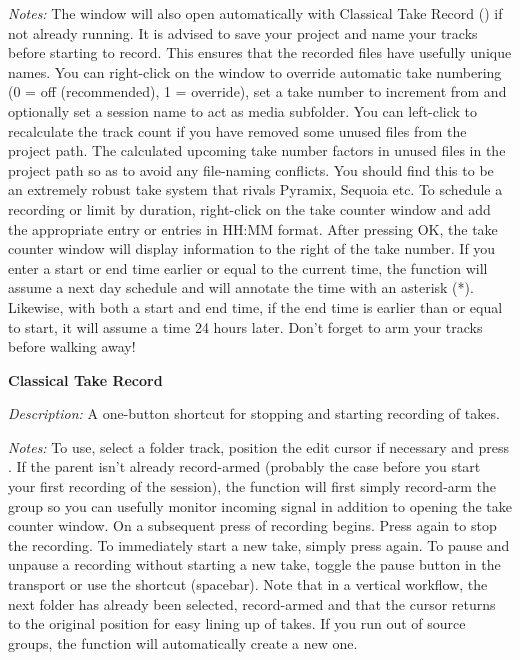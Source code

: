 \documentclass[10pt,american]{article}
\begin{document}
\emph{Notes:} The window will also open automatically with Classical Take Record
() if not already running. It is advised to save your project and name
your tracks before starting to record. This ensures that the recorded files have
usefully unique names. You can right-click on the window to override automatic
take numbering (0 = off (recommended), 1 = override), set a take number to
increment from and optionally set a session name to act as media subfolder. You
can left-click to recalculate the track count if you have removed some unused
files from the project path. The calculated upcoming take number factors in
unused files in the project path so as to avoid any file-naming conflicts. You
should find this to be an extremely robust take system that rivals Pyramix,
Sequoia etc. To schedule a recording or limit by duration, right-click on the
take counter window and add the appropriate entry or entries in HH:MM format.
After pressing OK, the take counter window will display information to the right
of the take number. If you enter a start or end time earlier or equal to the
current time, the function will assume a next day schedule and will annotate the
time with an asterisk ({*}). Likewise, with both a start and end time, if the
end time is earlier than or equal to start, it will assume a time 24 hours
later. Don't forget to arm your tracks before walking away!

\textbf{Classical Take Record }

\emph{Description:} A one-button shortcut for stopping and starting recording of
takes.

\emph{Notes:} To use, select a folder track, position the edit cursor if
necessary and press  . If the parent isn't already record-armed
(probably the case before you start your first recording of the session), the
function will first simply record-arm the group so you can usefully monitor
incoming signal in addition to opening the take counter window. On a subsequent
press of  recording begins. Press again to stop the recording. To
immediately start a new take, simply press  again. To pause and unpause
a recording without starting a new take, toggle the pause button in the
transport or use the shortcut \keys{\ctrl+\space} (spacebar). Note that in a
vertical workflow, the next folder has already been selected, record-armed and
that the cursor returns to the original position for easy lining up of takes. If
you run out of source groups, the function will automatically create a new one.
\end{document}
